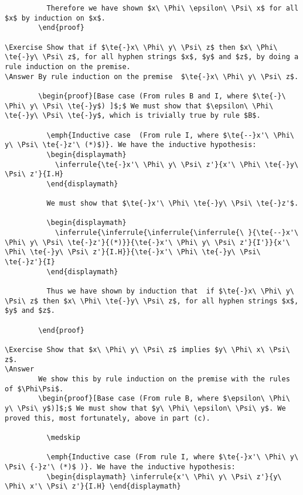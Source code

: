 \documentclass{book}
\begin{document}
\begin{verbatim}
          Therefore we have shown $x\ \Phi\ \epsilon\ \Psi\ x$ for all $x$ by induction on $x$.
        \end{proof}

\Exercise Show that if $\te{-}x\ \Phi\ y\ \Psi\ z$ then $x\ \Phi\ \te{-}y\ \Psi\ z$, for all hyphen strings $x$, $y$ and $z$, by doing a rule induction on the premise.
\Answer By rule induction on the premise  $\te{-}x\ \Phi\ y\ \Psi\ z$.
        
        \begin{proof}[Base case (From rules B and I, where $\te{-}\ \Phi\ y\ \Psi\ \te{-}y$) ]$;$ We must show that $\epsilon\ \Phi\ \te{-}y\ \Psi\ \te{-}y$, which is trivially true by rule $B$.
          
          \emph{Inductive case  (From rule I, where $\te{--}x'\ \Phi\ y\ \Psi\ \te{-}z'\ (*)$)}. We have the inductive hypothesis:
          \begin{displaymath}
            \inferrule{\te{-}x'\ \Phi\ y\ \Psi\ z'}{x'\ \Phi\ \te{-}y\ \Psi\ z'}{I.H}
          \end{displaymath}
          
          We must show that $\te{-}x'\ \Phi\ \te{-}y\ \Psi\ \te{-}z'$.
          
          \begin{displaymath}
            \inferrule{\inferrule{\inferrule{\inferrule{\ }{\te{--}x'\ \Phi\ y\ \Psi\ \te{-}z'}{(*)}}{\te{-}x'\ \Phi\ y\ \Psi\ z'}{I'}}{x'\ \Phi\ \te{-}y\ \Psi\ z'}{I.H}}{\te{-}x'\ \Phi\ \te{-}y\ \Psi\ \te{-}z'}{I}
          \end{displaymath}
          
          Thus we have shown by induction that  if $\te{-}x\ \Phi\ y\ \Psi\ z$ then $x\ \Phi\ \te{-}y\ \Psi\ z$, for all hyphen strings $x$, $y$ and $z$.
          
        \end{proof}
      
\Exercise Show that $x\ \Phi\ y\ \Psi\ z$ implies $y\ \Phi\ x\ \Psi\ z$.
\Answer
        We show this by rule induction on the premise with the rules of $\Phi\Psi$. 
        \begin{proof}[Base case (From rule B, where $\epsilon\ \Phi\ y\ \Psi\ y$)]$;$ We must show that $y\ \Phi\ \epsilon\ \Psi\ y$. We proved this, most fortunately, above in part (c).
          
          \medskip
          
          \emph{Inductive case (From rule I, where $\te{-}x'\ \Phi\ y\ \Psi\ {-}z'\ (*)$ )}. We have the inductive hypothesis:
          \begin{displaymath} \inferrule{x'\ \Phi\ y\ \Psi\ z'}{y\ \Phi\ x'\ \Psi\ z'}{I.H} \end{displaymath} 
            

\end{verbatim}
\end{document}
